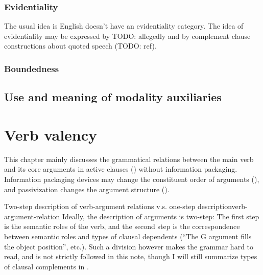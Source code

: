 \documentclass[UTF8, a4paper, oneside, scheme=plain]{ctexrep}
\begin{document}
\subsection{Evidentiality}

The usual idea is English doesn't have an evidentiality category.
The idea of evidentiality may be expressed by TODO: allegedly 
and by complement clause constructions about quoted speech (TODO: ref).

\subsection{Boundedness}



\section{Use and meaning of modality auxiliaries}\label{sec:verb-inflection.modal-use}


\chapter{Verb valency}

This chapter mainly discusses the grammatical relations between the main verb and its core arguments 
in active clauses ()
without information packaging.
Information packaging devices may change the constituent order of arguments 
(),
and passivization changes the argument structure (). 

\begin{infobox}{Two-step description of verb-argument relations v.s. one-step description}{verb-argument-relation}
    Ideally, the description of arguments is two-step:
    The first step is the semantic roles of the verb,
    and the second step is the correspondence between semantic roles 
    and types of clausal dependents
    (``The G argument fills the object position'', etc.).
    Such a division however makes the grammar hard to read,
    and is not strictly followed in this note,
    though I will still summarize types of clausal complements in .
\end{infobox}
\end{document}
